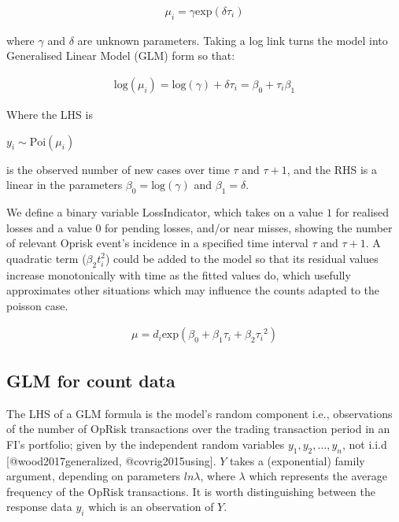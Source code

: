 \documentclass[]{article}
\begin{document}
\begin{eqnarray}
\mu_i = \gamma \mbox{exp}({\delta\tau_i}) \nonumber
\end{eqnarray}

\doublespacing

where \(\gamma\) and \(\delta\) are unknown parameters. Taking a log
link turns the model into Generalised Linear Model (GLM) form so that:

\singlespacing

\begin{eqnarray}\label{eqn:simplepoisson}
\mbox{log}(\mu_i) = \mbox{log}(\gamma) + \delta\tau_i = \beta_0 + \tau_i\beta_1
\end{eqnarray}

\doublespacing

Where the LHS is

\begin{math} y_i \sim \mbox{Poi}(\mu_i) \end{math}

is the observed number of new cases over time \(\tau\) and \(\tau+1\),
and the RHS is a linear in the parameters
\(\beta_0 = \mbox{log}(\gamma)\) and \(\beta_1 = \delta\).\medskip

We define a binary variable LossIndicator, which takes on a value \(1\)
for realised losses and a value \(0\) for pending losses, and/or near
misses, showing the number of relevant Oprisk event's incidence in a
specified time interval \(\tau\) and \(\tau+1\). A quadratic term
(\(\beta_2t_i^2\)) could be added to the model so that its residual
values increase monotonically with time as the fitted values do, which
usefully approximates other situations which may influence the counts
adapted to the poisson case.

\singlespacing

\begin{eqnarray}\label{eqn:adaptedpoisson}
\mu = d_i\mbox{exp}(\beta_0 + \beta_1\tau_i + \beta_2{\tau_i}^2) 
\end{eqnarray}

\doublespacing

\subsection{GLM for count data}

The LHS of a GLM formula is the model's random component i.e.,
observations of the number of OpRisk transactions over the trading
transaction period in an FI's portfolio; given by the independent random
variables \(y_1, y_2,\ldots, y_n\), not i.i.d {[}@wood2017generalized,
@covrig2015using{]}. \(Y\) takes a (exponential) family argument,
depending on parameters \(ln\lambda\), where \(\lambda\) which
represents the average frequency of the OpRisk transactions. It is worth
distinguishing between the response data \(y_i\) which is an observation
of \(Y\).\medskip
\end{document}
